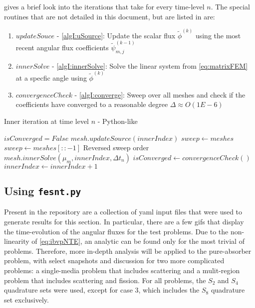 \documentclass{article}
\newcommand{\fepsi}{\tilde{\psi}}
\newcommand{\fepsimj}{\fepsi_{m,j}}
\newcommand{\fephi}{\tilde{\phi}}
\begin{document}
 gives a brief look into the iterations that take for every time-level
$n$.
The special routines that are not detailed in this document, but are listed in 
 are:
\begin{enumerate}
    \item $updateSouce$ - \cref{algI:uSource}: Update the scalar flux $\fephi^{(k)}$ using the 
        most recent angular flux coefficients $\fepsimj^{(k-1)}$
    \item $innerSolve$ - \cref{algI:innerSolve}: Solve the linear system from \cref{eq:matrixFEM} at a specfic
        angle using $\fephi^{(k)}$
    \item $convergenceCheck$ - \cref{algI:converge}: Sweep over all meshes and check if the coefficients have
        converged to a reasonable degree $\Delta\approx O(1E-6)$
\end{enumerate}
\begin{algorithm}
    \caption{Inner iteration at time level $n$ - Python-like}
    \label{alg:inner}
    \begin{algorithmic}[1]
    \State $isConverged = False$
            \State $mesh.updateSource(innerIndex)$ \label{algI:uSource}
        \EndFor
                \State $sweep\gets meshes$
            \Else
                \State $sweep \gets meshes[::-1]$
                \Comment Reversed sweep order
            \EndIf
                \State $mesh.innerSolve(\mu_m, innerIndex, \Delta t_n)$
                \label{algI:innerSolve}
            \EndFor
        \EndFor
        \State $isConverged\gets convergenceCheck()
        \label{algI:converge}
        $\State $innerIndex\gets innerIndex + 1$
    \EndWhile
    \end{algorithmic}
\end{algorithm}

\subsection{Using \texttt{fesnt.py}} \label{sec:usage}

Present in the repository are a collection of yaml input files that were used to generate
results for this section.
In particular, there are a few gifs that display the time-evolution of the angular fluxes
for the test problems.
Due to the non-linearity of \cref{eq:ibvpNTE}, an analytic can be found only for the most
trivial of problems.
Therefore, more in-depth analysis will be applied to the pure-absorber problem,
with select snapshots and discussion for two more complicated problems:
a single-media problem that includes scattering and a 
mulit-region problem that includes scattering and fission.
For all problems, the $S_2$ and $S_4$ quadrature sets were used, except for case 3, which 
includes the $S_8$ quadrature set exclusively.
\end{document}
